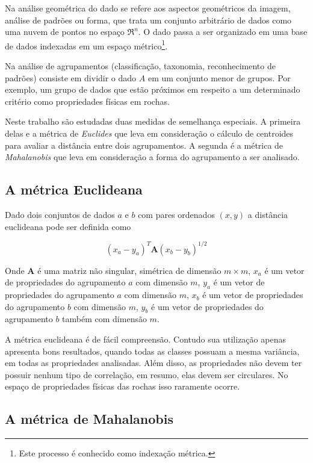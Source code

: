 Na análise geométrica do dado se refere aos aspectos geométricos da imagem, análise de padrões ou forma, que trata um conjunto arbitrário de dados como uma nuvem de pontos no espaço  $\Re ^{n}$. O dado passa a ser organizado em uma base de dados indexadas em um espaço métrico\footnote{Este processo é conhecido como indexação métrica.}.

Na análise de agrupamentos (classificação, taxonomia, reconhecimento de padrões) consiste em dividir o dado $A$ em um conjunto menor de grupos. Por exemplo, um grupo de dados que estão próximos em respeito a um determinado critério como propriedades físicas em rochas. 

Neste trabalho são estudadas duas medidas de semelhança especiais. A primeira delas e a métrica de \textit{Euclides} que leva em consideração o cálculo de centroides para avaliar a distância entre dois agrupamentos. A segunda é a métrica de \textit{Mahalanobis} que leva em consideração a forma do agrupamento a ser analisado.   

\subsection{A métrica Euclideana}
Dado dois conjuntos de dados $a$ e $b$ com pares ordenados $(x,y)$ a distância euclideana pode ser definida como 

\begin{equation}
(x_{a}-y_{a})^{T}\textbf{A}(x_{b}-y_{b})^{1/2}
\end{equation}

Onde $\textbf{A}$ é uma matriz não singular, simétrica de dimensão $m \times m $, $x_{a}$ é um vetor de propriedades do agrupamento $a$ com dimensão $m$, $y_{a}$ é um vetor de propriedades do agrupamento $a$ com dimensão $m$, $x_{b}$ é um vetor de propriedades do agrupamento $b$ com dimensão $m$, $y_{b}$ é um vetor de propriedades do agrupamento $b$ também com dimensão $m$.

A métrica euclideana é de fácil compreensão. Contudo sua utilização apenas apresenta bons resultados, quando todas as classes possuam a mesma variância, em todas as propriedades analisadas. Além disso, as propriedades não devem ter possuir nenhum tipo de correlação, em resumo, elas devem ser circulares. No espaço de propriedades físicas das rochas isso raramente ocorre. 



\subsection{A métrica de Mahalanobis}

